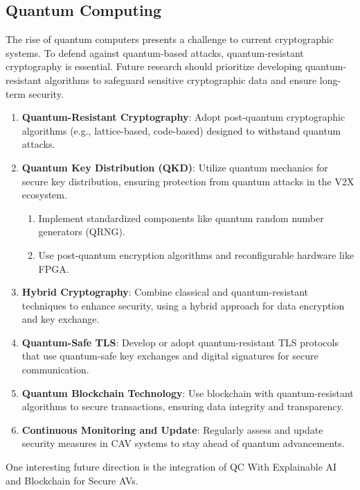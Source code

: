 \subsection{Quantum Computing}\label{subsec:quantum-computing}
The rise of quantum computers presents a challenge to current cryptographic systems.
To defend against quantum-based attacks, quantum-resistant cryptography is essential.
Future research should prioritize
developing quantum-resistant algorithms to safeguard sensitive cryptographic data and ensure long-term security\cite{ahmad2023machine, admass2023cyber}.

\begin{enumerate}
    \item \textbf{Quantum-Resistant Cryptography}:
    Adopt post-quantum cryptographic algorithms (e.g., lattice-based, code-based) designed to withstand quantum attacks.
    \item \textbf{Quantum Key Distribution (QKD)}: Utilize quantum mechanics for secure key distribution,
    ensuring protection from quantum attacks in the V2X ecosystem.
    \begin{enumerate}
        \item Implement standardized components like quantum random number generators (QRNG).
        \item Use post-quantum encryption algorithms and reconfigurable hardware like FPGA.
    \end{enumerate}
    \item \textbf{Hybrid Cryptography}: Combine classical and quantum-resistant techniques to enhance security,
    using a hybrid approach for data encryption and key exchange.
    \item \textbf{Quantum-Safe TLS}:
    Develop or adopt quantum-resistant TLS protocols
    that use quantum-safe key exchanges and digital signatures for secure communication.
    \item \textbf{Quantum Blockchain Technology}: Use blockchain with quantum-resistant algorithms to secure transactions,
    ensuring data integrity and transparency.
    \item \textbf{Continuous Monitoring and Update}:
    Regularly assess and update security measures in CAV systems to stay ahead of quantum advancements.
\end{enumerate}

One interesting future direction is the integration of QC With Explainable
AI and Blockchain for Secure AVs\cite{bendiab2023autonomous}.


